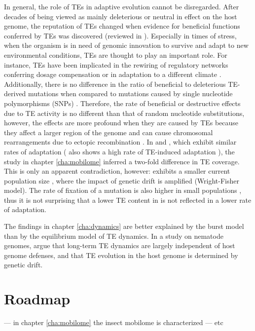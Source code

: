 In general, the role of TEs in adaptive evolution cannot be disregarded.
After decades of being viewed as mainly deleterious or neutral in effect
on the host genome, the reputation of TEs changed when evidence for
beneficial functions conferred by TEs was discovered (reviewed in
\citet{Oliver2012, Fedoroff2013}). Especially in times of stress, when
the organism is in need of genomic innovation to survive and adapt to
new environmental conditions, TEs are thought to play an important role.
For instance, TEs have been implicated in the rewiring of regulatory
networks conferring dosage compensation \citep{Ellison2013, Chuong2017}
or in adaptation to a different climate \citep{Gonzalez2010}.
Additionally, there is no difference in the ratio of beneficial to
deleterious TE-derived mutations when compared to mutations caused by
single nucleotide polymorphisms (SNPs) \citep{Akagi2013, Barron2014}.
Therefore, the rate of beneficial or destructive effects due to TE
activity is no different than that of random nucleotide substitutions,
however, the effects are more profound when they are caused by TEs
because they affect a larger region of the genome and can cause
chromosomal rearrangements due to ectopic recombination
\citep{Gray2000}. In  and , which exhibit similar rates of adaptation \citep{Bachtrog2008}
( also shows a high rate of TE-induced
adaptation \citep{Gonzalez2008}), the study in chapter
\ref{cha:mobilome} inferred a two-fold difference in TE coverage. This
is only an apparent contradiction, however: 
exhibits a smaller current population size \citep{Bachtrog2008}, where
the impact of genetic drift is amplified (Wright-Fisher model). The rate
of fixation of a mutation is also higher in small populations
\citep{Kimura1969}, thus it is not surprising that a lower TE content in
 is not reflected in a lower rate of adaptation.




The findings in chapter \ref{cha:dynamics} are better explained by the
burst model than by the equilibrium model of TE dynamics. In a study on
nematode genomes, \citet{Szitenberg2016} argue that long-term TE
dynamics are largely independent of host genome defenses, and that TE
evolution in the host genome is determined by genetic drift.



\section{Roadmap}

  --- in chapter
\ref{cha:mobilome} the insect mobilome is characterized --- etc
